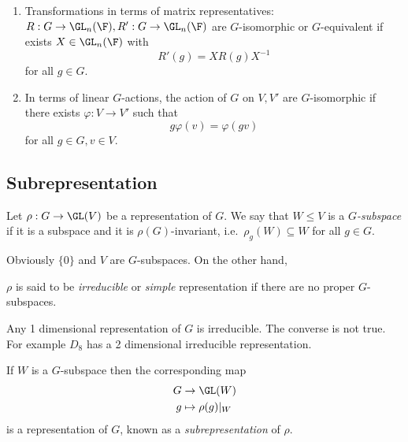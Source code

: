 \documentclass[a4paper]{article}
\begin{document}
\begin{proposition}\leavevmode
  \begin{enumerate}
  \item Transformations in terms of matrix representatives: \(R: G \to \GL_n(\F), R': G \to \GL_n(\F)\) are \(G\)-isomorphic or \(G\)-equivalent if exists \(X \in \GL_n(\F)\) with
    \[
      R'(g) = XR(g)X^{-1}
    \]
    for all \(g \in G\).
  \item In terms of linear \(G\)-actions, the action of \(G\) on \(V, V'\) are \(G\)-isomorphic if there exists \(\varphi: V \to V'\) such that
    \[
      g\varphi(v) = \varphi(gv)
    \]
    for all \(g \in G, v \in V\).
\end{enumerate}
\end{proposition}

\subsection{Subrepresentation}

\begin{definition}[\(G\)-subspace]
  Let \(\rho: G \to \GL(V)\) be a representation of \(G\). We say that \(W \leq V\) is a \emph{\(G\)-subspace} if it is a subspace and it is \(\rho(G)\)-invariant, i.e.\ \(\rho_g(W) \subseteq W\) for all \(g \in G\).
\end{definition}

Obviously \(\{0\}\) and \(V\) are \(G\)-subspaces. On the other hand,

\begin{definition}
  \(\rho\) is said to be \emph{irreducible} or \emph{simple} representation if there are no proper \(G\)-subspaces.
\end{definition}

\begin{eg}
  Any 1 dimensional representation of \(G\) is irreducible. The converse is not true. For example \(D_8\) has a 2 dimensional irreducible representation.
\end{eg}

\begin{definition}[subrepresentation]
  If \(W\) is a \(G\)-subspace then the corresponding map
  \begin{align*}
    G &\to \GL(W) \\
    g &\mapsto \rho(g)|_W
  \end{align*}
  is a representation of \(G\), known as a \emph{subrepresentation} of \(\rho\).
\end{definition}
\end{document}
